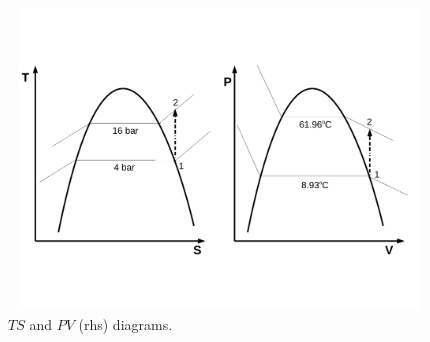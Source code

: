 \documentclass[calculator,datasheet,sample]{exam}
\begin{document}
\begin{question}
\begin{enumerate}
\begin{enumerate}[(a)]
{\begin{figure}[!h]
\begin{center}
\includegraphics[width=12.0cm,height=8.0cm]{./Pics/Exam_PV-TS_Diagrams}
\vspace{-1.7cm}
\caption{$TS$ and $PV$ (rhs) diagrams.}\label{Ex02:Q05}
\end{center}
\end{figure}
}
\end{enumerate}


\end{enumerate}
\end{question}
\end{document}
